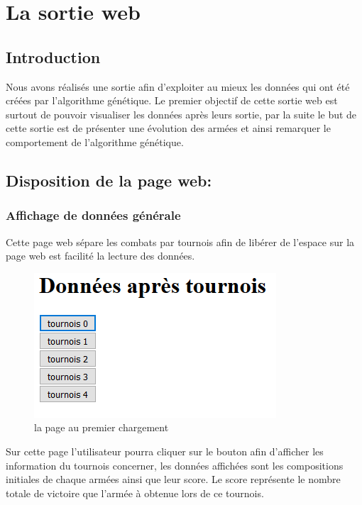 \section{La sortie web}

\subsection{Introduction}

	Nous avons réalisés une sortie afin d'exploiter au mieux les données qui ont été créées par l'algorithme génétique. Le premier objectif de cette sortie web est surtout de pouvoir visualiser les données après leurs sortie, par la suite le but de cette sortie est de présenter une évolution des armées et ainsi remarquer le comportement de l'algorithme génétique.

\subsection{Disposition de la page web:}

	\subsubsection{Affichage de données générale}
	
		Cette page web sépare les combats par tournois afin de libérer de l'espace sur la page web est facilité la lecture des données. 
		
		\begin{figure}
			\center
			\includegraphics[scale=1]{webimg/index.PNG}
			\caption{la page au premier chargement} 
		\end{figure}
		
		Sur cette page l'utilisateur pourra cliquer sur le bouton afin d'afficher les information du tournois concerner, les données affichées sont les compositions initiales de chaque armées ainsi que leur score. Le score représente le nombre totale de victoire que l'armée à obtenue lors de ce tournois.
		

